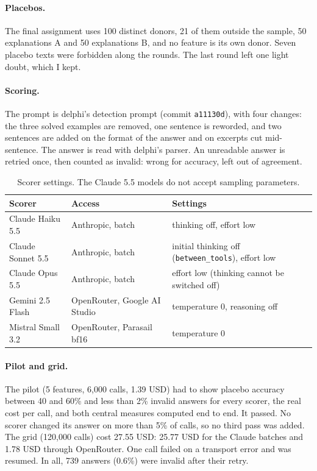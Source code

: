 \documentclass[11pt]{article}
\begin{document}
\paragraph{Placebos.} The final assignment uses 100 distinct donors, 21 of them
outside the sample, 50 explanations A and 50 explanations B, and no feature is its own
donor. Seven placebo texts were forbidden along the rounds. The last round left one
light doubt, which I kept.

\paragraph{Scoring.} The prompt is delphi's detection prompt (commit \texttt{a11130d}),
with four changes: the three solved examples are removed, one sentence is reworded, and
two sentences are added on the format of the answer and on excerpts cut mid-sentence.
The answer is read with delphi's parser. An unreadable answer is retried once, then
counted as invalid: wrong for accuracy, left out of agreement.

\begin{table}[h]
\centering
\small
\begin{tabular}{lll}
\toprule
Scorer & Access & Settings \\
\midrule
Claude Haiku 5.5 & Anthropic, batch & thinking off, effort low \\
Claude Sonnet 5.5 & Anthropic, batch & initial thinking off (\texttt{between\_tools}), effort low \\
Claude Opus 5.5 & Anthropic, batch & effort low (thinking cannot be switched off) \\
Gemini 2.5 Flash & OpenRouter, Google AI Studio & temperature 0, reasoning off \\
Mistral Small 3.2 & OpenRouter, Parasail bf16 & temperature 0 \\
\bottomrule
\end{tabular}
\caption{Scorer settings. The Claude 5.5 models do not accept sampling parameters.}
\label{tab:settings}
\end{table}

\paragraph{Pilot and grid.} The pilot (5 features, 6,000 calls, 1.39 USD) had to show
placebo accuracy between 40 and 60\% and less than 2\% invalid answers for every
scorer, the real cost per call, and both central measures computed end to end. It
passed. No scorer changed its answer on more than 5\% of calls, so no third pass was
added. The grid (120,000 calls) cost 27.55 USD: 25.77 USD for the Claude batches and
1.78 USD through OpenRouter. One call failed on a transport error and was resumed.
In all, 739 answers (0.6\%) were invalid after their retry.
\end{document}
